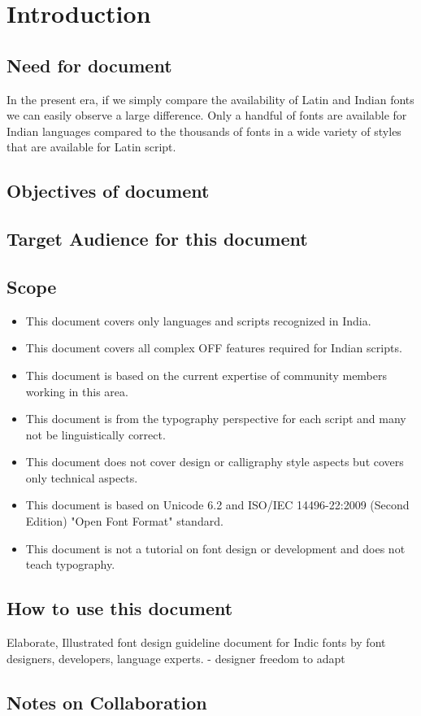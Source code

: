 \chapter{Introduction}


\section{Need for document}

In the present era, if we simply compare the availability of Latin and Indian fonts we can easily observe a large difference. Only a handful of fonts are available for Indian languages compared to the thousands of fonts in a wide  variety of styles that are available for Latin script.

\section{Objectives of document}

\section{Target Audience for this document}

\section{Scope}
\begin{itemize}
\item This document covers only languages and scripts recognized in India.
\item This document covers all complex OFF features required for Indian scripts.
\item This document is based on the current expertise of community members working in this area.
\item This document is from the typography perspective for each script and many not be linguistically correct.
\item This document does not cover design or calligraphy style aspects but covers only technical aspects.
\item This document is based on Unicode 6.2 and ISO/IEC 14496-22:2009 (Second Edition) "Open Font Format" standard.
\item This document is not a tutorial on font design or development and does not teach typography.
\end{itemize}

\section{How to use this document}

Elaborate, Illustrated font design guideline document for Indic fonts by font designers, developers, language experts.
- designer freedom to adapt

\section{Notes on Collaboration}
